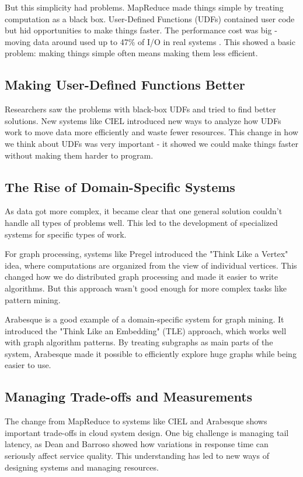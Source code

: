 \documentclass[12pt]{article}
\begin{document}
But this simplicity had problems. MapReduce made things simple by treating computation as a black box. User-Defined Functions (UDFs) contained user code but hid opportunities to make things faster. The performance cost was big - moving data around used up to 47\% of I/O in real systems \cite{olston2008pig}. This showed a basic problem: making things simple often means making them less efficient.

\subsection{Making User-Defined Functions Better}
Researchers saw the problems with black-box UDFs and tried to find better solutions. New systems like CIEL \cite{murray2011ciel} introduced new ways to analyze how UDFs work to move data more efficiently and waste fewer resources. This change in how we think about UDFs was very important - it showed we could make things faster without making them harder to program.

\subsection{The Rise of Domain-Specific Systems}
As data got more complex, it became clear that one general solution couldn't handle all types of problems well. This led to the development of specialized systems for specific types of work.

For graph processing, systems like Pregel \cite{malewicz2010pregel} introduced the "Think Like a Vertex" idea, where computations are organized from the view of individual vertices. This changed how we do distributed graph processing and made it easier to write algorithms. But this approach wasn't good enough for more complex tasks like pattern mining.

Arabesque \cite{teixeira2015arabesque} is a good example of a domain-specific system for graph mining. It introduced the "Think Like an Embedding" (TLE) approach, which works well with graph algorithm patterns. By treating subgraphs as main parts of the system, Arabesque made it possible to efficiently explore huge graphs while being easier to use.

\subsection{Managing Trade-offs and Measurements}
The change from MapReduce to systems like CIEL and Arabesque shows important trade-offs in cloud system design. One big challenge is managing tail latency, as Dean and Barroso \cite{dean2013tail} showed how variations in response time can seriously affect service quality. This understanding has led to new ways of designing systems and managing resources.
\end{document}
